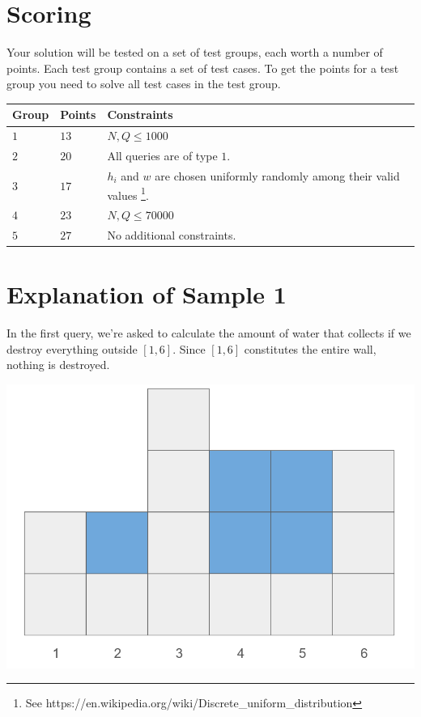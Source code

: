 \section*{Scoring}
Your solution will be tested on a set of test groups, each worth a number of points. Each test group contains
a set of test cases. To get the points for a test group you need to solve all test cases in the test group.

\noindent
\begin{tabular}{| l | l | p{12cm} |}
  \hline
  \textbf{Group} & \textbf{Points} & \textbf{Constraints} \\ \hline
  $1$    & $13$       & $N, Q \leq 1000$ \\ \hline
  $2$    & $20$       & All queries are of type $1$. \\ \hline
  $3$    & $17$       & $h_i$ and $w$ are chosen uniformly randomly among their valid values \footnote{See https://en.wikipedia.org/wiki/Discrete\_uniform\_distribution}. \\ \hline
  $4$    & $23$       & $N, Q \leq 70000$ \\ \hline
  $5$    & $27$       & No additional constraints. \\ \hline
\end{tabular}

\section*{Explanation of Sample 1}
In the first query, we're asked to calculate the amount of water that collects if we destroy everything outside $[1,6]$. Since
$[1,6]$ constitutes the entire wall, nothing is destroyed.
\begin{center}
  \includegraphics[scale=0.2]{mur2.png}
\end{center}

